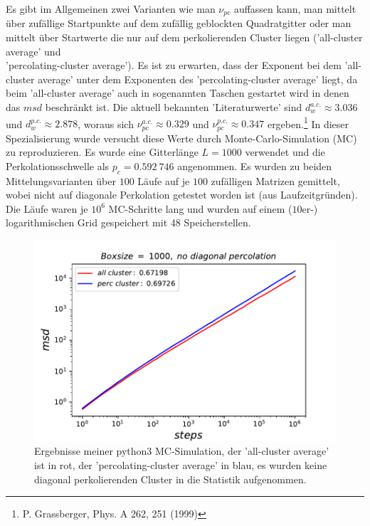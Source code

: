 \documentclass[a4paper, 12pt]{report}
\begin{document}
Es gibt im Allgemeinen zwei Varianten wie man $\nu_{pc}$ auffassen kann, man mittelt über zufällige Startpunkte auf dem zufällig geblockten Quadratgitter oder man mittelt über Startwerte die nur auf dem perkolierenden Cluster liegen ('all-cluster average' und \\ \noindent'percolating-cluster average'). Es ist zu erwarten, dass der Exponent bei dem 'all-cluster average' unter dem Exponenten des 'percolating-cluster average' liegt, da beim 'all-cluster average' auch in sogenannten Taschen gestartet wird in denen das $msd$ beschränkt ist. Die aktuell bekannten 'Literaturwerte' sind $d_w^{a.c.} \approx 3.036$ und $d_w^{p.c.} \approx 2.878$, woraus sich $\nu_{pc}^{a.c.} \approx 0.329$ und $\nu_{pc}^{p.c.} \approx 0.347$ ergeben.\footnote[4]{P. Grassberger, Phys. A 262, 251 (1999)} In dieser Spezialisierung wurde versucht diese Werte durch Monte-Carlo-Simulation (MC) zu reproduzieren. Es wurde eine Gitterlänge $L=1000$ verwendet und die Perkolationsschwelle als $p_c = 0.592\ 746$ angenommen. Es wurden zu beiden Mittelungsvarianten über $100$ Läufe auf je $100$ zufälligen Matrizen gemittelt, wobei nicht auf diagonale Perkolation getestet worden ist (aus Laufzeitgründen). Die Läufe waren je $10^6$ MC-Schritte lang und wurden auf einem ($10$er-) logarithmischen Grid gespeichert mit 48 Speicherstellen. 
\begin{figure}[h!]
	\centering
	\includegraphics[scale=0.9]{acpcold1000.pdf}
	\caption{Ergebnisse meiner python3 MC-Simulation, der 'all-cluster average' ist in rot, der 'percolating-cluster average' in blau, es wurden keine diagonal perkolierenden Cluster in die Statistik aufgenommen.}
\end{figure}
\vspace{0,5cm}
\end{document}

